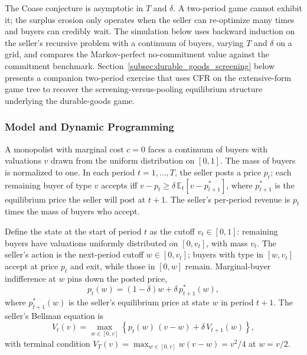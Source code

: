 The Coase conjecture is asymptotic in $T$ and $\delta$. A two-period game cannot exhibit it; the surplus erosion only operates when the seller can re-optimize many times and buyers can credibly wait. The simulation below uses backward induction on the seller's recursive problem with a continuum of buyers, varying $T$ and $\delta$ on a grid, and compares the Markov-perfect no-commitment value against the commitment benchmark. Section~\ref{subsec:durable_goods_screening} below presents a companion two-period exercise that uses CFR on the extensive-form game tree to recover the screening-versus-pooling equilibrium structure underlying the durable-goods game.

\subsubsection{Model and Dynamic Programming}

A monopolist with marginal cost $c = 0$ faces a continuum of buyers with valuations $v$ drawn from the uniform distribution on $[0, 1]$. The mass of buyers is normalized to one. In each period $t = 1, \ldots, T$, the seller posts a price $p_t$; each remaining buyer of type $v$ accepts iff $v - p_t \ge \delta \, \mathbb{E}_t[v - p_{t+1}^*]$, where $p_{t+1}^*$ is the equilibrium price the seller will post at $t+1$. The seller's per-period revenue is $p_t$ times the mass of buyers who accept.

Define the state at the start of period $t$ as the cutoff $v_t \in [0, 1]$: remaining buyers have valuations uniformly distributed on $[0, v_t]$, with mass $v_t$. The seller's action is the next-period cutoff $w \in [0, v_t]$; buyers with type in $[w, v_t]$ accept at price $p_t$ and exit, while those in $[0, w]$ remain. Marginal-buyer indifference at $w$ pins down the posted price,
\begin{equation}
p_t(w) = (1 - \delta) w + \delta \, p_{t+1}^*(w),
\label{eq:coase_marginal_price}
\end{equation}
where $p_{t+1}^*(w)$ is the seller's equilibrium price at state $w$ in period $t+1$. The seller's Bellman equation is
\begin{equation}
V_t(v) = \max_{w \in [0, v]} \left\{ p_t(w) \, (v - w) + \delta \, V_{t+1}(w) \right\},
\label{eq:coase_bellman}
\end{equation}
with terminal condition $V_T(v) = \max_{w \in [0, v]} w (v - w) = v^2 / 4$ at $w = v/2$.

